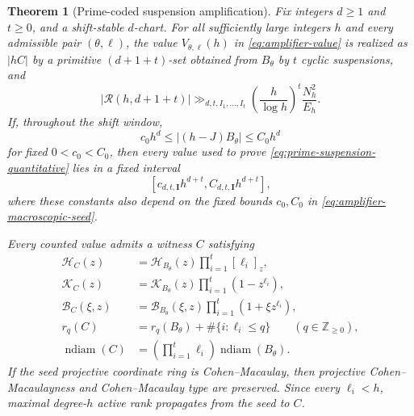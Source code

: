 \documentclass[11pt,reqno]{amsart}
\newtheorem{theorem}{Theorem}[section]
\theoremstyle{definition}
\theoremstyle{remark}
\newcommand{\Rcal}{\mathcal R}
\newcommand{\ndiam}{\operatorname{ndiam}}
\begin{document}
\begin{theorem}[Prime-coded suspension amplification]
\label{thm:prime-filter-amplification}
Fix integers $d\geq1$ and $t\geq0$, and a shift-stable $d$-chart.  For all
sufficiently large integers $h$ and every admissible pair
$(\theta,\boldsymbol\ell)$, the value
$V_{\theta,\boldsymbol\ell}(h)$ in \eqref{eq:amplifier-value} is realized as
$|hC|$ by a primitive $(d+1+t)$-set obtained from $B_\theta$ by $t$ cyclic suspensions,
and
\begin{equation}\label{eq:prime-suspension-quantitative}
 |\Rcal(h,d+1+t)|
 \gg_{d,t,I_1,\ldots,I_t}
 \left(\frac h{\log h}\right)^t\frac{N_h^2}{E_h}.
\end{equation}
If, throughout the shift window,
\begin{equation}\label{eq:amplifier-macroscopic-seed}
 c_0 h^d\leq |(h-J)B_\theta|\leq C_0 h^d
\end{equation}
for fixed $0<c_0<C_0$, then every value used to prove
\eqref{eq:prime-suspension-quantitative} lies in a fixed interval
\begin{equation}\label{eq:amplifier-macroscopic-output}
[c_{d,t,\mathbf I}h^{d+t},C_{d,t,\mathbf I}h^{d+t}],
\end{equation}
where these constants also depend on the fixed bounds $c_0,C_0$ in
\eqref{eq:amplifier-macroscopic-seed}.

Every counted value admits a witness $C$ satisfying
\begin{align}
 \mathcal H_C(z)
 &=\mathcal H_{B_\theta}(z)\prod_{i=1}^t[\ell_i]_z,
 \label{eq:amplifier-Hilbert-transport}\\
 \mathcal K_C(z)
 &=\mathcal K_{B_\theta}(z)\prod_{i=1}^t(1-z^{\ell_i}),
 \label{eq:amplifier-K-transport}\\
 \mathcal B_C(\xi,z)
 &=\mathcal B_{B_\theta}(\xi,z)\prod_{i=1}^t(1+\xi z^{\ell_i}),
 \label{eq:amplifier-Betti-transport}\\
 r_q(C)&=r_q(B_\theta)+\#\{i:\ell_i\leq q\}
 \qquad(q\in\mathbb Z_{\geq0}),
 \label{eq:amplifier-rank-transport}\\
 \ndiam(C)&=\left(\prod_{i=1}^t\ell_i\right)\ndiam(B_\theta).
 \label{eq:amplifier-diameter-transport}
\end{align}
If the seed projective coordinate ring is Cohen--Macaulay, then projective
Cohen--Macaulayness and Cohen--Macaulay type are preserved.  Since every
$\ell_i<h$, maximal degree-$h$ active rank propagates from the seed to $C$.
\end{theorem}
\end{document}
